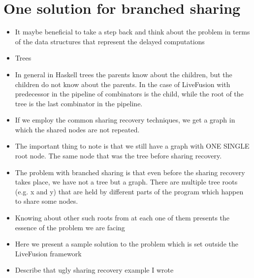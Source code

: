 \documentclass[preamble.tex]{subfiles}
\begin{document}
\section{One solution for branched sharing}
\begin{itemize}
\item It maybe beneficial to take a step back and think about the problem in terms of the data structures that represent the delayed computations
\item Trees
\item In general in Haskell trees the parents know about the children, but the children do not know about the parents. In the case of LiveFusion with predecessor in the pipeline of combinators is the child, while the root of the tree is the last combinator in the pipeline.
\item If we employ the common sharing recovery techniques, we get a graph in which the shared nodes are not repeated.
\item The important thing to note is that we still have a graph with ONE SINGLE root node. The same node that was the tree before sharing recovery.
\item The problem with branched sharing is that even before the sharing recovery takes place, we have not a tree but a graph. There are multiple tree roots (e.g. x and y) that are held by different parts of the program which happen to share some nodes.
\item Knowing about other such roots from at each one of them presents the essence of the problem we are facing
\item Here we present a sample solution to the problem which is set outside the LiveFusion framework
\item Describe that ugly sharing recovery example I wrote
\end{itemize}
\end{document}
